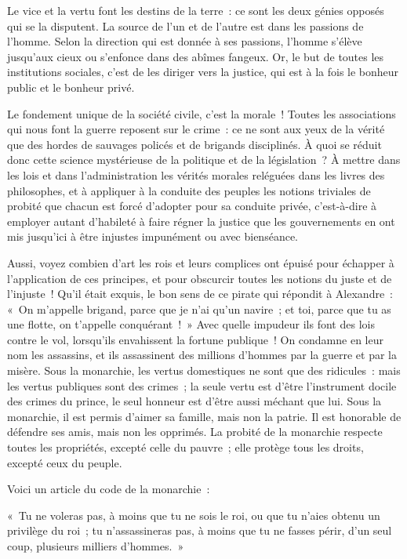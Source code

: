 \documentclass[french,twoside]{book} %
\begin{document}
Le vice et la vertu font les destins de la terre : ce sont les deux génies opposés qui se la disputent. La source de l’un et de l’autre est dans les passions de l’homme. Selon la direction qui est donnée à ses passions, l’homme s’élève jusqu’aux cieux ou s’enfonce dans des abîmes fangeux. Or, le but de toutes les institutions sociales, c’est de les diriger vers la justice, qui est à la fois le bonheur public et le bonheur privé.\par
Le fondement unique de la société civile, c’est la morale ! Toutes les associations qui nous font la guerre reposent sur le crime : ce ne sont aux yeux de la vérité que des hordes de sauvages policés et de brigands disciplinés. À quoi se réduit donc cette science mystérieuse de la politique et de la législation ? À mettre dans les lois et dans l’administration les vérités morales reléguées dans les livres des philosophes, et à appliquer à la conduite des peuples les notions triviales de probité que chacun est forcé d’adopter pour sa conduite privée, c’est-à-dire à employer autant d’habileté à faire régner la justice que les gouvernements en ont mis jusqu’ici à être injustes impunément ou avec bienséance.\par
Aussi, voyez combien d’art les rois et leurs complices ont épuisé pour échapper à l’application de ces principes, et pour obscurcir toutes les notions du juste et de l’injuste ! Qu’il était exquis, le bon sens de ce pirate qui répondit à Alexandre : « On m’appelle brigand, parce que je n’ai qu’un navire ; et toi, parce que tu as une flotte, on t’appelle conquérant ! » Avec quelle impudeur ils font des lois contre le vol, lorsqu’ils envahissent la fortune publique ! On condamne en leur nom les assassins, et ils assassinent des millions d’hommes par la guerre et par la misère. Sous la monarchie, les vertus domestiques ne sont que des ridicules : mais les vertus publiques sont des crimes ; la seule vertu est d’être l’instrument docile des crimes du prince, le seul honneur est d’être aussi méchant que lui. Sous la monarchie, il est permis d’aimer sa famille, mais non la patrie. Il est honorable de défendre ses amis, mais non les opprimés. La probité de la monarchie respecte toutes les propriétés, excepté celle du pauvre ; elle protège tous les droits, excepté ceux du peuple.\par
Voici un article du code de la monarchie :\par
« Tu ne voleras pas, à moins que tu ne sois le roi, ou que tu n’aies obtenu un privilège du roi ; tu n’assassineras pas, à moins que tu ne fasses périr, d’un seul coup, plusieurs milliers d’hommes. »\par
\end{document}
